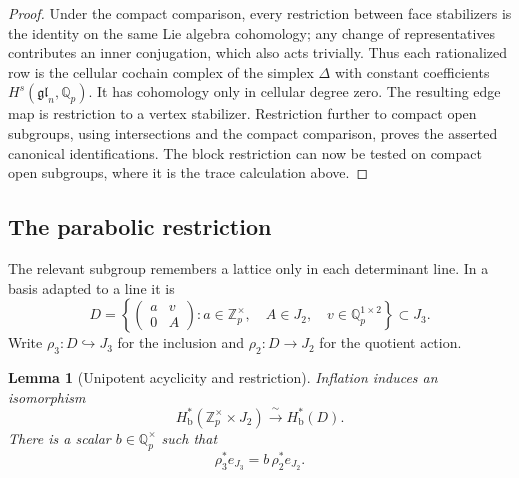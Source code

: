 \documentclass[11pt]{article}
\numberwithin{equation}{section}
\newtheorem{lemma}[theorem]{Lemma}
\theoremstyle{definition}
\theoremstyle{remark}
\begin{document}
\begin{proof}
Under the compact comparison, every restriction between face
stabilizers is the identity on the same Lie algebra cohomology;
any change of representatives contributes an inner conjugation,
which also acts trivially.  Thus each rationalized row is the
cellular cochain complex of the simplex $\Delta$ with constant
coefficients $H^s(\mathfrak{gl}_n,\mathbb Q_p)$.
It has cohomology only in cellular degree zero.
The resulting edge map is restriction to a vertex stabilizer.
Restriction further to compact open subgroups, using intersections
and the compact comparison, proves the asserted canonical
identifications.  The block restriction can now be tested on
compact open subgroups, where it is the trace calculation above.
\end{proof}

\subsection{The parabolic restriction}

The relevant subgroup remembers a lattice only in each determinant
line.  In a basis adapted to a line it is
\[
 D=\left\{
 \begin{pmatrix}a&v\\0&A\end{pmatrix}:
 a\in\mathbb Z_p^\times,\quad A\in J_2,\quad
 v\in\mathbb Q_p^{1\times2}\right\}\subset J_3.
\]
Write $\rho_3:D\hookrightarrow J_3$ for the inclusion and
$\rho_2:D\to J_2$ for the quotient action.

\begin{lemma}[Unipotent acyclicity and restriction]
\label{lem:parabolic}
Inflation induces an isomorphism
\[
 H^*_{\mathrm b}(\mathbb Z_p^\times\times J_2)
       \xrightarrow{\ \sim\ }H^*_{\mathrm b}(D).
\]
There is a scalar $b\in\mathbb Q_p^\times$ such that
\[
 \rho_3^*e_{J_3}=b\,\rho_2^*e_{J_2}.
\]
\end{lemma}
\end{document}
